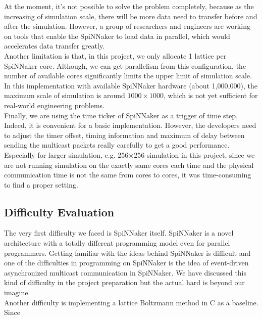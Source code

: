 At the moment, it's not possible to solve the problem completely, because as the increasing of simulation scale, there will be more data need to transfer before and after the simulation. However, a group of researchers and engineers are working on tools that enable the SpiNNaker to load data in parallel, which would accelerates data transfer greatly.\\

Another limitation is that, in this project, we only allocate 1 lattice per SpiNNaker core. Although, we can get parallelism from this configuration, the number of available cores significantly limits the upper limit of simulation scale. In this implementation with available SpiNNaker hardware (about 1,000,000), the maximum scale of simulation is around  $1000 \times 1000$, which is not yet sufficient for real-world engineering problems.\\

Finally, we are using the time ticker of SpiNNaker as a trigger of time step. Indeed, it is convenient for a basic implementation. However, the developers need to adjust the timer offset, timing information and maximum of delay between sending the multicast packets really carefully to get a good performance. Especially for larger simulation, e.g. 256$\times$256 simulation in this project, since we are not running simulation on the exactly same cores each time and the physical communication time is not the same from cores to cores, it was time-consuming to find a proper setting.\\

\subsection{Difficulty Evaluation}
The very first difficulty we faced is SpiNNaker itself. SpiNNaker is a novel architecture with a totally different programming model even for parallel programmers. Getting familiar with the ideas behind SpiNNaker is difficult and one of the difficulties in programming on SpiNNaker is the idea of event-driven asynchronized multicast communication in SpiNNaker. We have discussed this kind of difficulty in the project preparation but the actual hard is beyond our imagine.\\

Another difficulty is implementing a lattice Boltzmann method in C as a baseline. Since

